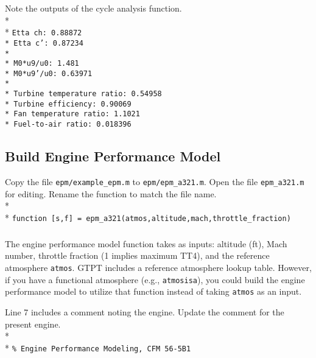 \documentclass[12pt,twoside]{article}
\begin{document}
Note the outputs of the cycle analysis function.\\*
\\*
\texttt{Etta ch: 0.88872 \\*
Etta c': 0.87234 \\*
\\*
M0*u9/u0: 1.481 \\*
M0*u9'/u0: 0.63971 \\*
\\*
Turbine temperature ratio: 0.54958 \\*
Turbine efficiency: 0.90069 \\*
Fan temperature ratio: 1.1021 \\*
Fuel-to-air ratio: 0.018396}

\subsection{Build Engine Performance Model}
Copy the file \texttt{epm/example\_epm.m} to \texttt{epm/epm\_a321.m}.
Open the file \texttt{epm\_a321.m} for editing.  Rename the function
to match the file name. \\*
\\*
\texttt{function [s,f] = epm\_a321(atmos,altitude,mach,throttle\_fraction)}

\subparagraph{}
The engine performance model function takes as inputs: altitude (ft), Mach number, throttle fraction (1 implies maximum TT4), and the reference atmosphere \texttt{atmos}.  GTPT includes a reference atmosphere lookup table.  However, if you have a functional atmosphere (e.g., \texttt{atmosisa}), you could build the engine performance model to utilize that function instead of taking \texttt{atmos} as an input.

Line 7 includes a comment noting the engine.  Update the comment for the present engine. \\*
\\*
\texttt{\% Engine Performance Modeling, CFM 56-5B1}
\end{document}
